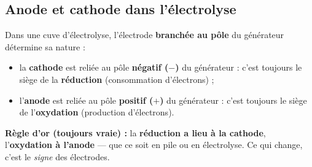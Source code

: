 \documentclass[11pt,a4paper]{article}
\begin{document}
\subsection{Anode et cathode dans l'électrolyse}

\begin{theoreme}
Dans une cuve d'électrolyse, l'électrode \textbf{branchée au pôle} du générateur détermine sa
nature :
\begin{itemize}[leftmargin=1.6em,topsep=1pt,itemsep=2pt]
  \item la \textbf{cathode} est reliée au pôle \textbf{négatif ($-$)} du générateur : c'est toujours
        le siège de la \textbf{réduction} (consommation d'électrons) ;
  \item l'\textbf{anode} est reliée au pôle \textbf{positif ($+$)} du générateur : c'est toujours
        le siège de l'\textbf{oxydation} (production d'électrons).
\end{itemize}
\textbf{Règle d'or (toujours vraie) :} la \textbf{réduction a lieu à la cathode}, l'\textbf{oxydation
à l'anode} — que ce soit en pile ou en électrolyse. Ce qui change, c'est le \emph{signe} des
électrodes.
\end{theoreme}
\end{document}
